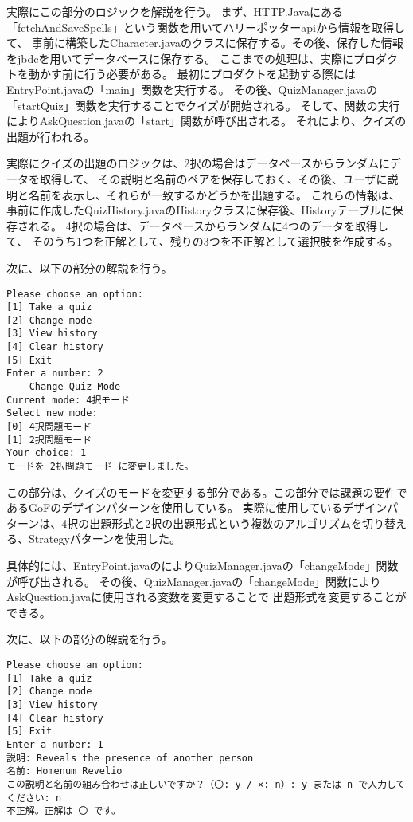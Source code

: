 \documentclass[uplatex,dvipdfmx,a4paper]{jsarticle}
\begin{document}
\par 実際にこの部分のロジックを解説を行う。
まず、HTTP.Javaにある「fetchAndSaveSpells」という関数を用いてハリーポッターapiから情報を取得して、
事前に構築したCharacter.javaのクラスに保存する。その後、保存した情報をjbdcを用いてデータベースに保存する。
ここまでの処理は、実際にプロダクトを動かす前に行う必要がある。
最初にプロダクトを起動する際にはEntryPoint.javaの「main」関数を実行する。
その後、QuizManager.javaの「startQuiz」関数を実行することでクイズが開始される。
そして、関数の実行によりAskQuestion.javaの「start」関数が呼び出される。
それにより、クイズの出題が行われる。
\par 実際にクイズの出題のロジックは、2択の場合はデータベースからランダムにデータを取得して、
その説明と名前のペアを保存しておく、その後、ユーザに説明と名前を表示し、それらが一致するかどうかを出題する。
これらの情報は、事前に作成したQuizHistory.javaのHistoryクラスに保存後、Historyテーブルに保存される。 4択の場合は、データベースからランダムに4つのデータを取得して、
そのうち1つを正解として、残りの3つを不正解として選択肢を作成する。
\par 次に、以下の部分の解説を行う。
\begin{lstlisting}[style=result]
  Please choose an option:
[1] Take a quiz
[2] Change mode
[3] View history
[4] Clear history
[5] Exit
Enter a number: 2
--- Change Quiz Mode ---
Current mode: 4択モード
Select new mode:
[0] 4択問題モード
[1] 2択問題モード
Your choice: 1
モードを 2択問題モード に変更しました。
\end{lstlisting}
\par この部分は、クイズのモードを変更する部分である。この部分では課題の要件であるGoFのデザインパターンを使用している。
実際に使用しているデザインパターンは、4択の出題形式と2択の出題形式という複数のアルゴリズムを切り替える、Strategyパターンを使用した。
\par 具体的には、EntryPoint.javaのによりQuizManager.javaの「changeMode」関数が呼び出される。
その後、QuizManager.javaの「changeMode」関数によりAskQuestion.javaに使用される変数を変更することで
出題形式を変更することができる。
\par 次に、以下の部分の解説を行う。
\begin{lstlisting}[style=result]
  Please choose an option:
[1] Take a quiz
[2] Change mode
[3] View history
[4] Clear history
[5] Exit
Enter a number: 1
説明: Reveals the presence of another person
名前: Homenum Revelio
この説明と名前の組み合わせは正しいですか？（〇: y / ×: n）: y または n で入力してください: n
不正解。正解は 〇 です。
\end{lstlisting}
\end{document}
